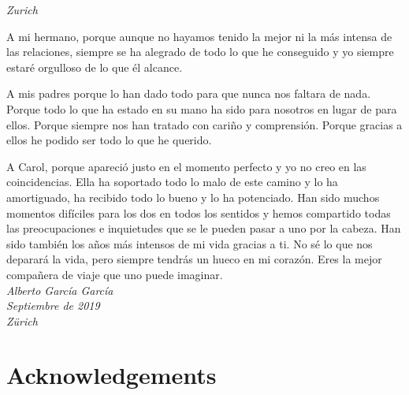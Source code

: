 \emph{Zurich}

A mi hermano, porque aunque no hayamos tenido la mejor ni la más intensa de las relaciones, siempre se ha alegrado de todo lo que he conseguido y yo siempre estaré orgulloso de lo que él alcance.

A mis padres porque lo han dado todo para que nunca nos faltara de nada. Porque todo lo que ha estado en su mano ha sido para nosotros en lugar de para ellos. Porque siempre nos han tratado con cariño y comprensión. Porque gracias a ellos he podido ser todo lo que he querido.

A Carol, porque apareció justo en el momento perfecto y yo no creo en las coincidencias. Ella ha soportado todo lo malo de este camino y lo ha amortiguado, ha recibido todo lo bueno y lo ha potenciado. Han sido muchos momentos difíciles para los dos en todos los sentidos y hemos compartido todas las preocupaciones e inquietudes que se le pueden pasar a uno por la cabeza. Han sido también los años más intensos de mi vida gracias a ti. No sé lo que nos deparará la vida, pero siempre tendrás un hueco en mi corazón. Eres la mejor compañera de viaje que uno puede imaginar.\\

\emph{Alberto García García}\\
\emph{Septiembre de 2019}\\
\emph{Zürich}\\

\chapter{Acknowledgements}

\lipsum[3]
\lipsum[2]
\lipsum[4]
\lipsum[5]
\lipsum[6]
